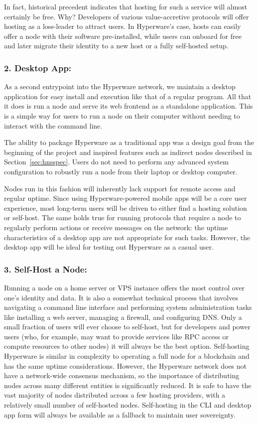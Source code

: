 \documentclass[runningheads]{llncs}
\begin{document}
In fact, historical precedent indicates that hosting for such a service will almost certainly be free.
Why?
Developers of various value-accretive protocols will offer hosting as a loss-leader to attract users.
In Hyperware's case, hosts can easily offer a node with their software pre-installed, while users can onboard for free and later migrate their identity to a new host or a fully self-hosted setup.

\subsubsection{2. Desktop App:}

As a second entrypoint into the Hyperware network, we maintain a desktop application for easy install and execution like that of a regular program.
All that it does is run a node and serve its web frontend as a standalone application.
This is a simple way for users to run a node on their computer without needing to interact with the command line.

The ability to package Hyperware as a traditional app was a design goal from the beginning of the project and inspired features such as indirect nodes described in Section~\ref{sec:hnsspec}.
Users do not need to perform any advanced system configuration to robustly run a node from their laptop or desktop computer.

Nodes run in this fashion will inherently lack support for remote access and regular uptime.
Since using Hyperware-powered mobile apps will be a core user experience, most long-term users will be driven to either find a hosting solution or self-host.
The same holds true for running protocols that require a node to regularly perform actions or receive messages on the network: the uptime characteristics of a desktop app are not appropriate for such tasks.
However, the desktop app will be ideal for testing out Hyperware as a casual user.

\subsubsection{3. Self-Host a Node:}

Running a node on a home server or VPS instance offers the most control over one's identity and data.
It is also a somewhat technical process that involves navigating a command line interface and performing system administration tasks like installing a web server, managing a firewall, and configuring DNS.
Only a small fraction of users will ever choose to self-host, but for developers and power users (who, for example, may want to provide services like RPC access or compute resources to other nodes) it will always be the best option.
Self-hosting Hyperware is similar in complexity to operating a full node for a blockchain and has the same uptime considerations.
However, the Hyperware network does not have a network-wide consensus mechanism, so the importance of distributing nodes across many different entities is significantly reduced.
It is safe to have the vast majority of nodes distributed across a few hosting providers, with a relatively small number of self-hosted nodes.
Self-hosting in the CLI and desktop app form will always be available as a fallback to maintain user sovereignty.
\end{document}
